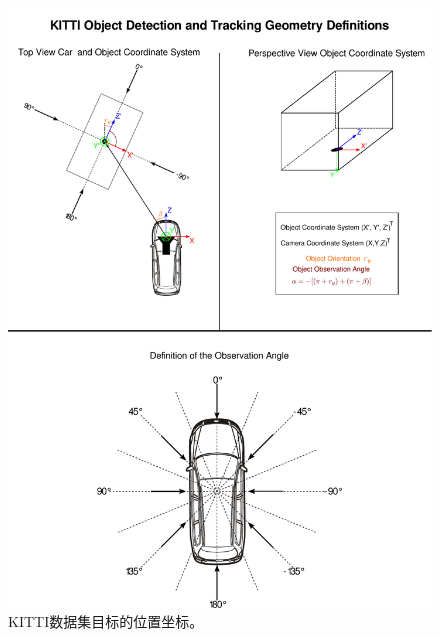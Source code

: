 \begin{figure}[!t]
\begin{minipage}[t]{0.48\textwidth}
		\includegraphics[trim={12cm, 20cm, 1.8cm, 2.5cm}, clip,width=\textwidth]{./imgs/KITTI_obj.pdf}
		\caption{KITTI数据集目标的位置坐标。}
		\label{fig:kitti_box3d}
	\end{minipage}
\end{figure}
